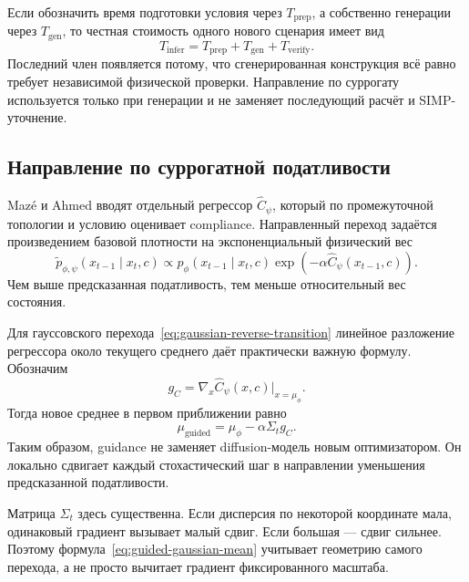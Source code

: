 Если обозначить время подготовки условия через $T_{\mathrm{prep}}$, а собственно генерации через $T_{\mathrm{gen}}$, то честная стоимость одного нового сценария имеет вид
\begin{equation}
 T_{\mathrm{infer}}
 =
 T_{\mathrm{prep}}
 +T_{\mathrm{gen}}
 +T_{\mathrm{verify}}.
\end{equation}
Последний член появляется потому, что сгенерированная конструкция всё равно требует независимой физической проверки. Направление по суррогату используется только при генерации и не заменяет последующий расчёт и SIMP-уточнение.

\subsection{Направление по суррогатной податливости}

Mazé и Ahmed вводят отдельный регрессор $\widehat C_\psi$, который по промежуточной топологии и условию оценивает compliance. Направленный переход задаётся произведением базовой плотности на экспоненциальный физический вес
\begin{equation}
 \widetilde p_{\phi,\psi}(x_{t-1}\mid x_t,c)
 \propto
 p_\phi(x_{t-1}\mid x_t,c)
 \exp\!\left(-\alpha\widehat C_\psi(x_{t-1},c)\right).
\end{equation}
Чем выше предсказанная податливость, тем меньше относительный вес состояния.

Для гауссовского перехода~\eqref{eq:gaussian-reverse-transition} линейное разложение регрессора около текущего среднего даёт практически важную формулу. Обозначим
\begin{equation}
 g_C
 =
 \nabla_x\widehat C_\psi(x,c)
 \big|_{x=\mu_\phi}.
\end{equation}
Тогда новое среднее в первом приближении равно
\begin{equation}
\label{eq:guided-gaussian-mean}
 \boxed{
 \mu_{\mathrm{guided}}
 =
 \mu_\phi
 -\alpha\Sigma_t g_C
 }.
\end{equation}
Таким образом, guidance не заменяет diffusion-модель новым оптимизатором. Он локально сдвигает каждый стохастический шаг в направлении уменьшения предсказанной податливости.

Матрица $\Sigma_t$ здесь существенна. Если дисперсия по некоторой координате мала, одинаковый градиент вызывает малый сдвиг. Если большая --- сдвиг сильнее. Поэтому формула~\eqref{eq:guided-gaussian-mean} учитывает геометрию самого перехода, а не просто вычитает градиент фиксированного масштаба.

